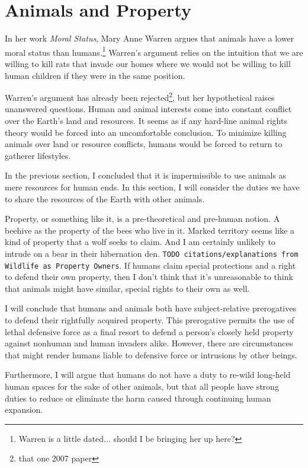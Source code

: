 \chapter{Animals and Property}

    In her work \emph{Moral Status}, Mary Anne Warren argues that animals have
    a lower moral status than humans.\footnote{Warren is a little dated...
    should I be bringing her up here?} Warren's argument relies on the intuition
    that we are willing to kill rats that invade our homes where we would not
    be willing to kill human children if they were in the same position.
    
    Warren's argument has already been rejected\footnote{that one 2007 paper},
    but her hypothetical raises unanswered questions. Human and animal interests
    come into constant conflict over the Earth's land and resources. It seems as
    if any hard-line animal rights theory would be forced into an uncomfortable
    conclusion. To minimize killing animals over land or resource
    conflicts, humans would be forced to return to gatherer lifestyles.
    
    In the previous section, I concluded that it is impermissible to use
    animals as mere resources for human ends. In this section, I will consider
    the duties we have to share the resources of the Earth with other animals.

	Property, or something like it, is a pre-theoretical and pre-human notion.
	A beehive as the property of the bees who live in it.  Marked territory
	seems like a kind of property that a wolf seeks to claim.  And I am
	certainly unlikely to intrude on a bear in their hibernation den.
	\texttt{TODO citations/explanations from Wildlife as Property Owners}.  If
	humans claim special protections and a right to defend their own property,
	then I don’t think that it’s unreasonable to think that animals might have
	similar, special rights to their own as well.
    
    I will conclude that humans and animals both have subject-relative 
    prerogatives to defend their rightfully acquired property. This prerogative
    permits the use of lethal defensive force as a final resort to defend
    a person's closely held property against nonhuman and human invaders alike.
    However, there are circumstances that might render humans liable to 
	defensive force or intrusions by other beings.
	
    Furthermore, I will argue that humans do not have a duty to re-wild
    long-held human spaces for the sake of other animals, but that all people
    have strong duties to reduce or eliminate the harm caused through
    continuing human expansion.
    
